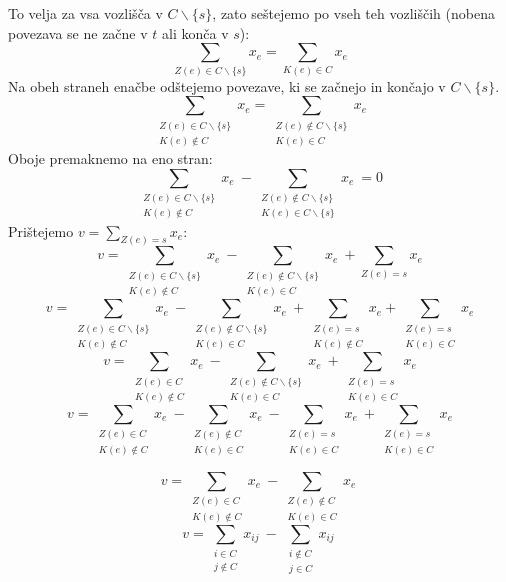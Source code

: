 \documentclass[11pt, a4paper]{article}
\begin{document}
    To velja za vsa vozlišča v \(C \backslash \{s\}\), zato seštejemo po vseh teh vozliščih (nobena povezava se ne začne v \(t\) ali konča v \(s\)):
    \[
        \sum_{Z(e) \in C \backslash \{s\}} x_e = \sum_{K(e) \in C} x_e    
    \]
    Na obeh straneh enačbe odštejemo povezave, ki se začnejo in končajo v \(C \backslash \{s\}\).
    \[
        \sum_{\substack{Z(e) \in C \backslash \{s\} \\ K(e) \notin C}} x_e = \sum_{\substack{Z(e) \notin C \backslash \{s\} \\ K(e) \in C}} x_e    
    \]
    Oboje premaknemo na eno stran:
    \[
         \sum_{\substack{Z(e) \in C \backslash \{s\} \\ K(e) \notin C}} x_e\ - \sum_{\substack{Z(e) \notin C \backslash \{s\} \\ K(e) \in C \backslash \{s\}}} x_e\ = 0 
    \]
    Prištejemo \(\displaystyle v = \sum_{Z(e)=s} x_e\):
    \[
        v = \sum_{\substack{Z(e) \in C \backslash \{s\} \\ K(e) \notin C}} x_e\ - \sum_{\substack{Z(e) \notin C \backslash \{s\} \\ K(e) \in C}} x_e\ + \sum_{Z(e)=s} x_e
    \]
    \[
        v = \sum_{\substack{Z(e) \in C \backslash \{s\} \\ K(e) \notin C}} x_e\ - \sum_{\substack{Z(e) \notin C \backslash \{s\} \\ K(e) \in C}} x_e\ + \sum_{\substack{Z(e)=s\\ K(e) \notin C}} x_e + \sum_{\substack{Z(e)=s\\ K(e) \in C}} x_e
    \]
    \[
        v = \sum_{\substack{Z(e) \in C \\ K(e) \notin C}} x_e\ - \sum_{\substack{Z(e) \notin C \backslash \{s\} \\ K(e) \in C}} x_e\ + \sum_{\substack{Z(e)=s\\ K(e) \in C}} x_e
    \]
    \[
        v = \sum_{\substack{Z(e) \in C \\ K(e) \notin C}} x_e\ - \sum_{\substack{Z(e) \notin C \\ K(e) \in C}} x_e\ - \sum_{\substack{Z(e)=s \\ K(e) \in C}} x_e\ + \sum_{\substack{Z(e)=s \\ K(e) \in C}} x_e 
    \]

    \[
        v = \sum_{\substack{Z(e) \in C \\ K(e) \notin C}} x_e\ - \sum_{\substack{Z(e) \notin C \\ K(e) \in C}} x_e\
    \]
    \[
        v = \sum_{\substack{i \in C \\ j \notin C}} x_{ij}\ -\ \sum_{\substack{i \notin C \\ j \in C}} x_{ij}\
    \]
\end{document}

